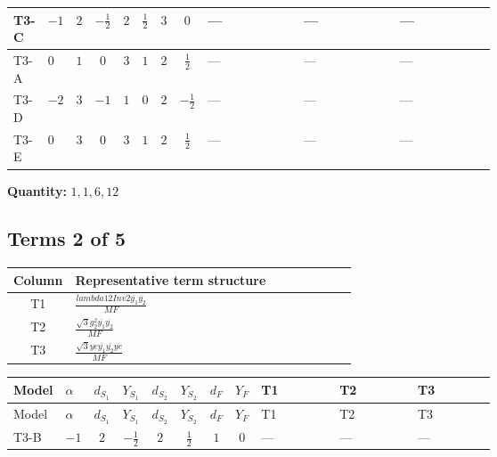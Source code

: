 \documentclass[8pt]{article}
\begin{document}
\begin{landscape}
\begin{longtable}{@{}llcccccc >{\raggedright\arraybackslash}p{0.21\linewidth} >{\raggedright\arraybackslash}p{0.21\linewidth} >{\raggedright\arraybackslash}p{0.21\linewidth}@{}}
\midrule
T3-C & $-1$ & $2$ & $-\frac{1}{2}$ & $2$ & $\frac{1}{2}$ & $3$ & $0$ & --- & --- & --- \\
\midrule
T3-A & $0$ & $1$ & $0$ & $3$ & $1$ & $2$ & $\frac{1}{2}$ & --- & --- & --- \\
\midrule
T3-D & $-2$ & $3$ & $-1$ & $1$ & $0$ & $2$ & $-\frac{1}{2}$ & --- & --- & --- \\
\midrule
T3-E & $0$ & $3$ & $0$ & $3$ & $1$ & $2$ & $\frac{1}{2}$ & --- & --- & --- \\
\midrule
\bottomrule
\end{longtable}
\clearpage
\noindent\textbf{Quantity: }$\mathrm{1,1,6,12}$\par\smallskip
\subsection*{Terms 2 of 5}
\begin{center}
\begin{tabular}{@{}c >{\raggedright\arraybackslash}p{0.82\linewidth}@{}}
\toprule
Column & Representative term structure \\
\midrule
T1 & \(\displaystyle \frac{lambda12Inv2 \overline{y_{1}} \overline{y_{2}}}{MF}\) \\
\midrule
T2 & \(\displaystyle \frac{\sqrt{3} g_{2}^{2} \overline{y_{1}} \overline{y_{2}}}{MF}\) \\
\midrule
T3 & \(\displaystyle \frac{\sqrt{3} ye \overline{y_{1}} \overline{y_{2}} \overline{ye}}{MF}\) \\
\midrule
\bottomrule
\end{tabular}
\end{center}
\smallskip
\tiny
\begin{longtable}{@{}llcccccc >{\raggedright\arraybackslash}p{0.21\linewidth} >{\raggedright\arraybackslash}p{0.21\linewidth} >{\raggedright\arraybackslash}p{0.21\linewidth}@{}}
\toprule
Model & $\alpha$ & $d_{S_1}$ & $Y_{S_1}$ & $d_{S_2}$ & $Y_{S_2}$ & $d_F$ & $Y_F$ & T1 & T2 & T3 \\
\midrule
\endfirsthead
\toprule
Model & $\alpha$ & $d_{S_1}$ & $Y_{S_1}$ & $d_{S_2}$ & $Y_{S_2}$ & $d_F$ & $Y_F$ & T1 & T2 & T3 \\
\midrule
\endhead
T3-B & $-1$ & $2$ & $-\frac{1}{2}$ & $2$ & $\frac{1}{2}$ & $1$ & $0$ & --- & --- & --- \\
\midrule

\end{longtable}
\end{landscape}
\end{document}
